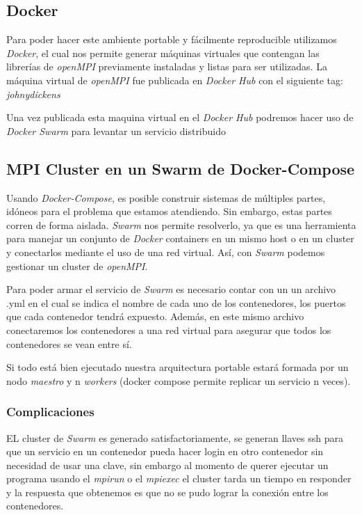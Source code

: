 \documentclass[DIV=calc, paper=letter, fontsize=11pt, twocolumn]{scrartcl}
\begin{document}
\subsection{Docker}
Para poder hacer este ambiente portable y fácilmente reproducible utilizamos \textit{Docker}, el cual nos permite generar máquinas virtuales que contengan las librerías de \textit{openMPI} previamente instaladas y listas para ser utilizadas. La máquina virtual de \textit{openMPI} fue publicada en \textit{Docker Hub} con el siguiente tag: \textit{johnydickens\openmpi}

Una vez publicada esta maquina virtual en el \textit{Docker Hub} podremos hacer uso de \textit{Docker Swarm} para levantar un servicio distribuido 

\subsection{MPI Cluster en un Swarm de Docker-Compose}

Usando \textit{Docker-Compose}, es posible construir sistemas de múltiples partes, idóneos para el problema que estamos atendiendo. Sin embargo, estas partes corren de forma aislada. \textit{Swarm} nos permite resolverlo, ya que es una herramienta para manejar un conjunto de \textit{Docker} containers en un mismo host o en un cluster y conectarlos mediante el uso de una red virtual. Así, con \textit{Swarm} podemos gestionar un cluster de \textit{openMPI}.

Para poder armar el servicio de \textit{Swarm} es necesario contar con un un archivo .yml en el cual se indica el nombre de cada uno de los contenedores, los puertos que cada contenedor tendrá expuesto. Además, en este mismo archivo conectaremos los contenedores a una red virtual para asegurar que todos los contenedores se vean entre sí.

Si todo está bien ejecutado nuestra arquitectura portable estará formada por un nodo \textit{maestro} y n \textit{workers} (docker compose permite replicar un servicio n veces). 

\subsubsection{Complicaciones}

EL cluster de \textit{Swarm} es generado satisfactoriamente, se generan llaves ssh para que un servicio en un contenedor pueda hacer login en otro contenedor sin necesidad de usar una clave, sin embargo al momento de querer ejecutar un programa usando el \textit{mpirun} o el \textit{mpiexec} el cluster tarda un tiempo en responder y la respuesta que obtenemos es que no se pudo lograr la conexión entre los contenedores.
\end{document}
